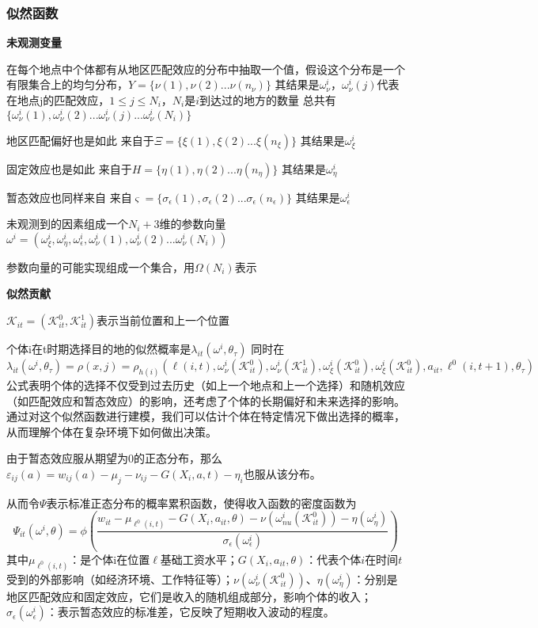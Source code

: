 \documentclass[a4paper,12pt]{article}
\begin{document}
\subsubsection{似然函数}

\textbf{未观测变量}

在每个地点中个体都有从地区匹配效应的分布中抽取一个值，假设这个分布是一个有限集合上的均匀分布，$Y=\{\nu(1),\nu(2)...\nu(n_{\nu})\}$
其结果是$\omega^{i}_{\nu}$，$\omega^{i}_{\nu}(j)$代表在地点j的匹配效应，$1\leqslant j\leqslant N_i$，$N_i$是$i$到达过的地方的数量
总共有$\{\omega^{i}_{\nu}(1),\omega^{i}_{\nu}(2)...\omega^{i}_{\nu}(j)...\omega^{i}_{\nu}(N_i)\}$

地区匹配偏好也是如此
来自于$\Xi=\{\xi(1),\xi(2)...\xi(n_{\xi})\}$
其结果是$\omega^{i}_{\xi}$

固定效应也是如此
来自于$H=\{\eta(1),\eta(2)...\eta(n_\eta)\}$
其结果是$\omega^{i}_{\eta}$

暂态效应也同样来自
来自$\varsigma=\{\sigma_{\epsilon}(1),\sigma_{\epsilon}(2)...\sigma_{\epsilon}(n_{\epsilon})\}$
其结果是$\omega^{i}_{\epsilon}$

未观测到的因素组成一个$N_{i}+3$维的参数向量$\omega^{i}=(\omega^{i}_{\xi},\omega^{i}_{\eta},\omega^{i}_{\epsilon},\omega^{i}_{\nu}(1),\omega^{i}_{\nu}(2)...\omega^{i}_{\nu}(N_{i}))$

参数向量的可能实现组成一个集合，用$\Omega(N_{i})$表示

\textbf{似然贡献}

$\mathcal{K}_{it}=(\mathcal{K}_{it}^{0},\mathcal{K}_{it}^{1})$表示当前位置和上一个位置

个体i在t时期选择目的地的似然概率是$\lambda_{it}(\omega^{i},\theta_{\tau})$
同时在
\begin{equation}
  \lambda_{it}(\omega^{i},\theta_{\tau})=\rho(x,j)=\rho_{h(i)}(\ell(i,t),\omega_{\nu}^{i}(\mathcal{K}_{it}^{0}),\omega_{\nu}^{i}(\mathcal{K}_{it}^{1}),\omega_{\xi}^{i}(\mathcal{K}_{it}^{0}),\omega_{\xi}^{i}(\mathcal{K}_{it}^{0}),a_{it},\ell^{0}(i,t+1),\theta_{\tau})
\end{equation}
公式表明个体的选择不仅受到过去历史（如上一个地点和上一个选择）和随机效应（如匹配效应和暂态效应）的影响，还考虑了个体的长期偏好和未来选择的影响。
通过对这个似然函数进行建模，我们可以估计个体在特定情况下做出选择的概率，从而理解个体在复杂环境下如何做出决策。


由于暂态效应服从期望为0的正态分布，那么$\varepsilon_{ij}(a)=w_{ij}(a)-\mu_j-\nu_{ij}-G(X_i,a,t)-\eta_i$也服从该分布。

从而令$\Psi$表示标准正态分布的概率累积函数，使得收入函数的密度函数为
\begin{equation}
  \Psi_{it}(\omega^{i},\theta)=\phi(\frac{w_{it} - \mu_{\ell^{0}(i,t)}-G(X_{i},a_{it},\theta)-\nu(\omega_{nu}^{i}(\mathcal{K}_{it}^{0}))-\eta(\omega_{\eta}^{i})  }{\sigma_{\epsilon}(\omega_{\epsilon}^{i})})
\end{equation}
其中$\mu_{\ell^{0}(i,t)}$：是个体i在位置$\ell$基础工资水平；$G(X_i, a_{it}, \theta)$：代表个体$i$在时间$t$受到的外部影响（如经济环境、工作特征等）；$\nu(\omega_{\nu}^i(\mathcal{K}_{it}^0))$、$\eta(\omega_{\eta}^i)$：分别是地区匹配效应和固定效应，它们是收入的随机组成部分，影响个体的收入；$\sigma_{\epsilon}(\omega_{\epsilon}^i)$：表示暂态效应的标准差，它反映了短期收入波动的程度。
\end{document}
